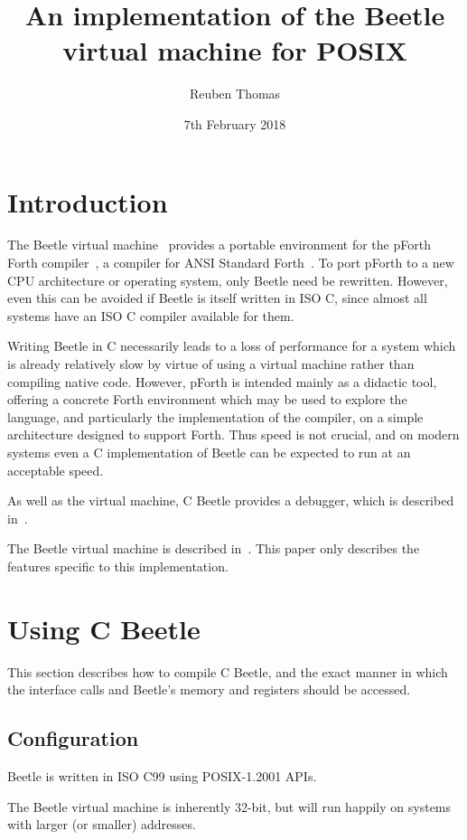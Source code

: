 \documentclass[english]{article}
\title{An implementation of the Beetle virtual machine for POSIX}
\author{Reuben Thomas}
\date{7th February 2018}
\begin{document}
\maketitle


\section{Introduction}

The Beetle virtual machine~\cite{beetle} provides a portable environment
for the pForth Forth compiler~\cite{beetledis}, a compiler for ANSI Standard
Forth~\cite{ANSIforth}. To port pForth to a new CPU architecture or operating system, only Beetle need be rewritten. However, even this can be
avoided if Beetle is itself written in ISO C, since almost all systems have
an ISO C compiler available for them.

Writing Beetle in C necessarily leads to a loss of performance for a system
which is already relatively slow by virtue of using a virtual machine
rather than compiling native code. However, pForth is intended mainly as a
didactic tool, offering a concrete Forth environment which may be used to
explore the language, and particularly the implementation of the compiler, on
a simple architecture designed to support Forth. Thus speed is not crucial,
and on modern systems even a C implementation of Beetle can be expected to
run at an acceptable speed.

As well as the virtual machine, C Beetle provides a debugger, which is described in~\cite{beetleuiface}.

The Beetle virtual machine is described in~\cite{beetle}. This paper only
describes the features specific to this implementation.


\section{Using C Beetle}

This section describes how to compile C Beetle, and the exact manner in which
the interface calls and Beetle's memory and registers should be accessed.


\subsection{Configuration}
\label{configuration}

Beetle is written in ISO C99 using POSIX-1.2001 APIs.

The Beetle virtual machine is inherently 32-bit, but will run happily on systems with larger (or smaller) addresses.
\end{document}
